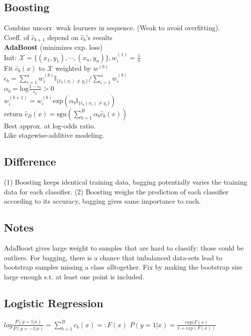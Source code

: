 \subsection*{Boosting}
Combine uncorr. weak learners in sequence. (Weak to avoid overfitting).\\
Coeff. of $\hat{c}_{b+1}$ depend on $\hat{c}_{b}$'s results\\
\textbf{AdaBoost} (minimizes exp. loss)\\
Init: $\mathcal{X}{=}\{(x_1,y_1),\cdots,(x_n,y_n)\}, w_i^{(1)}{=}\frac{1}{n}$\\
Fit  $\hat{c}_b(x)$ to $\mathcal{X}$ weighted by $w^{(b)}$\\
$\epsilon_b=\sum_{i=1}^nw_i^{(b)}\mathbb{I}_{\{\hat c_b(x_i)\not=y_i\}}/\sum_{i=1}^nw_i^{(b)}$\\
$\alpha_b = \mathrm{log}\frac{1-\epsilon_b}{\epsilon_b}>0$\\
$w_i^{(b+1)}=w_i^{(b)}\mathrm{exp}(\alpha_b\mathbb{I}_{\{{\hat c_b(x_i)\not=y_i}\}})$\\
return $\hat{c}_B(x){=}\mathrm{sgn}(\sum_{b{=}1}^B\alpha_b \hat c_b(x))$\\
Best approx. at log-odds ratio. \\
Like stagewise-additive modeling.

\subsection*{Difference}
(1) Boosting keeps identical training data, bagging potentially varies the training data for each classifier. (2) Boosting weighs the prediction of each classifier according to its accuracy, bagging gives same importance to each.

\subsection*{Notes}
AdaBoost gives large weight to samples that are hard to classify: those could be outliers. For bagging, there is a chance that imbalanced data-sets lead to bootstrap samples missing a class alltogether. Fix by making the bootstrap size large enough s.t. at least one point is included.
\subsection*{Logistic Regression}
$log\frac{P(y=1|x)}{P(y=-1|x)} = \sum_{b=1}^Bc_b(x) =: F(x)$
$P(y=1|x) = \frac{exp(F(x)}{1+exp(F(x))}$

